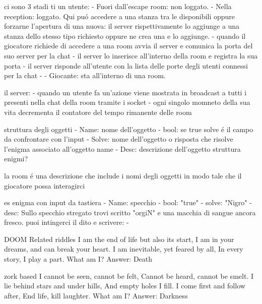 ci sono 3 stadi ti un utente:
  - Fuori dall'escape room: non loggato.
  - Nella reception: loggato. Qui puó accedere a una stanza tra le disponibili oppure forzarne l'apertura di una nuova: il server rispettivamente 
  lo aggiunge a una stanza dello stesso tipo richiesto oppure ne crea una e lo aggiunge.
      - quando il giocatore richiede di accedere a una room avvia il server e comunica la porta del suo server per la chat
      - il server lo inserisce all'interno della room e registra la sua porta
      - il server risponde all'utente con la lista delle porte degli utenti connessi per la chat 
      - 
  - Giocante: sta all'interno di una room.

il server:
  - quando un utente fa un'azione viene mostrata in broadcast a tutti i presenti nella chat della room tramite
    i socket
  - ogni singolo momneto della sua vita decrementa il contatore del tempo rimanente delle room 


struttura degli oggetti
  - Name: nome dell'oggetto
  - bool: se true solve é il campo da confrontare con l'input 
  - Solve: nome dell'oggetto o risposta che risolve l'enigma associato all'oggetto name
  - Desc: descrizione dell'oggetto
struttura enigmi?

la room é una descrizione che include i nomi degli oggetti in modo tale che il giocatore possa interagirci


es enigma con input da tastiera 
 - Name: specchio
 - bool: "true"
 - solve: "Nigro"
 - desc: Sullo specchio stregato trovi scritto "orgiN" e una macchia di sangue ancora fresco. puoi intingerci
    il dito e scrivere: 
 - 

DOOM Related riddles
I am the end of life but also its start,
I am in your dreams, and can break your heart.
I am inevitable, yet feared by all,
In every story, I play a part.
What am I?
Answer: Death


zork based
I cannot be seen, cannot be felt,
Cannot be heard, cannot be smelt.
I lie behind stars and under hills,
And empty holes I fill.
I come first and follow after,
End life, kill laughter.
What am I?
Answer: Darkness


